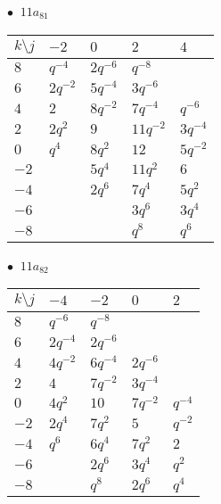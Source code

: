 \begin{minipage}{\linewidth}
$\bullet\ $ $11a_{81}$ \vspace{0.5em} \\
\begin{tabular}{l|llll}
$k \setminus j$ & $-2$ & $0$ & $2$ & $4$ \\
\hline
$8$ & $q^{-4}$ & $2q^{-6}$ & $q^{-8}$ &  \\
$6$ & $2q^{-2}$ & $5q^{-4}$ & $3q^{-6}$ &  \\
$4$ & $2$ & $8q^{-2}$ & $7q^{-4}$ & $q^{-6}$ \\
$2$ & $2q^{2}$ & $9$ & $11q^{-2}$ & $3q^{-4}$ \\
$0$ & $q^{4}$ & $8q^{2}$ & $12$ & $5q^{-2}$ \\
$-2$ &  & $5q^{4}$ & $11q^{2}$ & $6$ \\
$-4$ &  & $2q^{6}$ & $7q^{4}$ & $5q^{2}$ \\
$-6$ &  &  & $3q^{6}$ & $3q^{4}$ \\
$-8$ &  &  & $q^{8}$ & $q^{6}$ \\
\end{tabular}
\vspace{2em}
\end{minipage}
%
\begin{minipage}{\linewidth}
$\bullet\ $ $11a_{82}$ \vspace{0.5em} \\
\begin{tabular}{l|llll}
$k \setminus j$ & $-4$ & $-2$ & $0$ & $2$ \\
\hline
$8$ & $q^{-6}$ & $q^{-8}$ &  &  \\
$6$ & $2q^{-4}$ & $2q^{-6}$ &  &  \\
$4$ & $4q^{-2}$ & $6q^{-4}$ & $2q^{-6}$ &  \\
$2$ & $4$ & $7q^{-2}$ & $3q^{-4}$ &  \\
$0$ & $4q^{2}$ & $10$ & $7q^{-2}$ & $q^{-4}$ \\
$-2$ & $2q^{4}$ & $7q^{2}$ & $5$ & $q^{-2}$ \\
$-4$ & $q^{6}$ & $6q^{4}$ & $7q^{2}$ & $2$ \\
$-6$ &  & $2q^{6}$ & $3q^{4}$ & $q^{2}$ \\
$-8$ &  & $q^{8}$ & $2q^{6}$ & $q^{4}$ \\
\end{tabular}
\vspace{2em}
\end{minipage}
%

